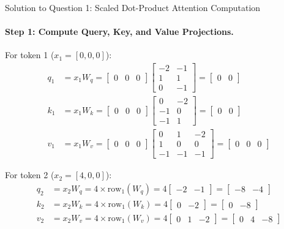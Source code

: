\documentclass[11pt,a4paper]{article}
\begin{document}
\begin{solutionbox}{Solution to Question 1: Scaled Dot-Product Attention Computation}
\paragraph{Step 1: Compute Query, Key, and Value Projections.}
For token 1 ($x_1 = [0, 0, 0]$):
\begin{align}
    q_1 &= x_1 W_q = \begin{bmatrix} 0 & 0 & 0 \end{bmatrix} \begin{bmatrix} -2 & -1 \\ 1 & 1 \\ 0 & -1 \end{bmatrix} = \begin{bmatrix} 0 & 0 \end{bmatrix} \\
    k_1 &= x_1 W_k = \begin{bmatrix} 0 & 0 & 0 \end{bmatrix} \begin{bmatrix} 0 & -2 \\ -1 & 0 \\ -1 & 1 \end{bmatrix} = \begin{bmatrix} 0 & 0 \end{bmatrix} \\
    v_1 &= x_1 W_v = \begin{bmatrix} 0 & 0 & 0 \end{bmatrix} \begin{bmatrix} 0 & 1 & -2 \\ 1 & 0 & 0 \\ -1 & -1 & -1 \end{bmatrix} = \begin{bmatrix} 0 & 0 & 0 \end{bmatrix}
\end{align}

For token 2 ($x_2 = [4, 0, 0]$):
\begin{align}
    q_2 &= x_2 W_q = 4 \times \text{row}_1(W_q) = 4 \begin{bmatrix} -2 & -1 \end{bmatrix} = \begin{bmatrix} -8 & -4 \end{bmatrix} \\
    k_2 &= x_2 W_k = 4 \times \text{row}_1(W_k) = 4 \begin{bmatrix} 0 & -2 \end{bmatrix} = \begin{bmatrix} 0 & -8 \end{bmatrix} \\
    v_2 &= x_2 W_v = 4 \times \text{row}_1(W_v) = 4 \begin{bmatrix} 0 & 1 & -2 \end{bmatrix} = \begin{bmatrix} 0 & 4 & -8 \end{bmatrix}
\end{align}


\end{solutionbox}
\end{document}
